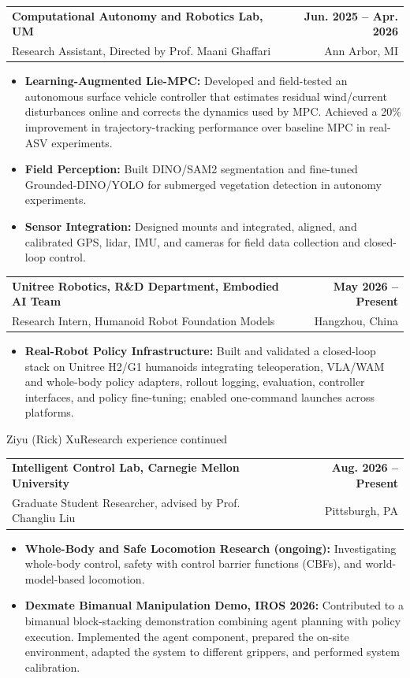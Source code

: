 \documentclass[11pt,letterpaper]{article}
\makeatletter
\newcommand{\resumeSubheading}[4]{
    \begin{tabularx}{\textwidth}{@{}Xr@{}}
        \textbf{#1} & \textbf{#2} \\
        #3 & #4 \\
    \end{tabularx}
}
\newcommand{\resumeItem}[1]{
    \item #1
}
\makeatother
\begin{document}
\resumeSubheading
{Computational Autonomy and Robotics Lab, UM }
{Jun. 2025 -- Apr. 2026}
{\hspace*{1.4em}Research Assistant, Directed by Prof. Maani Ghaffari}
{Ann Arbor, MI}
\begin{itemize}[leftmargin=2.4em, itemsep=0.5pt, topsep=0pt]
\small
\resumeItem{\textbf{Learning-Augmented Lie-MPC:} Developed and field-tested an autonomous surface vehicle controller that estimates residual wind/current disturbances online and corrects the dynamics used by MPC. Achieved a 20\% improvement in trajectory-tracking performance over baseline MPC in real-ASV experiments.}
\resumeItem{\textbf{Field Perception:} Built DINO/SAM2 segmentation and fine-tuned Grounded-DINO/YOLO for submerged vegetation detection in autonomy experiments.}
\resumeItem{\textbf{Sensor Integration:} Designed mounts and integrated, aligned, and calibrated GPS, lidar, IMU, and cameras for field data collection and closed-loop control.}
\end{itemize}

\resumeSubheading
{ Unitree Robotics, R\&D Department, Embodied AI Team}
{May 2026 -- Present}
{\hspace*{1.4em}Research Intern, Humanoid Robot Foundation Models}
{Hangzhou, China}
\begin{itemize}[leftmargin=2.4em, itemsep=0.5pt, topsep=0pt]
\small
\resumeItem{\textbf{Real-Robot Policy Infrastructure:} Built and validated a closed-loop stack on Unitree H2/G1 humanoids integrating teleoperation, VLA/WAM and whole-body policy adapters, rollout logging, evaluation, controller interfaces, and policy fine-tuning; enabled one-command launches across platforms.}
\end{itemize}

\newpage
{\small Ziyu (Rick) Xu}\hfill{\small Research experience continued}
\vspace{4pt}
\resumeSubheading
{Intelligent Control Lab, Carnegie Mellon University}
{Aug. 2026 -- Present}
{\hspace*{1.4em}Graduate Student Researcher, advised by Prof. Changliu Liu}
{Pittsburgh, PA}
\begin{itemize}[leftmargin=2.4em, itemsep=0.5pt, topsep=0pt]
\small
\resumeItem{\textbf{Whole-Body and Safe Locomotion Research (ongoing):} Investigating whole-body control, safety with control barrier functions (CBFs), and world-model-based locomotion.}
\resumeItem{\textbf{Dexmate Bimanual Manipulation Demo, IROS 2026:} Contributed to a bimanual block-stacking demonstration combining agent planning with policy execution. Implemented the agent component, prepared the on-site environment, adapted the system to different grippers, and performed system calibration.}
\end{itemize}
\end{document}
